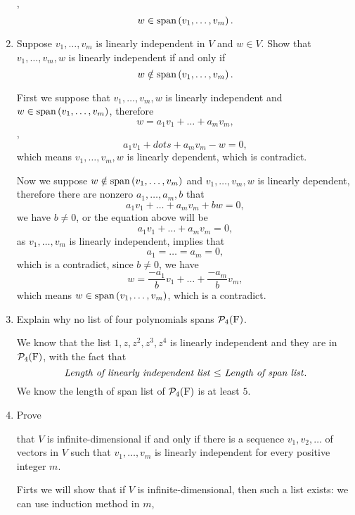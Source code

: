 \begin{enumerate}
\begin{solution}
            \ie, 
            \[ w \in \text{span}\left(v_1, \ldots, v_m\right).\]
        \end{solution}
    \item Suppose $v_1, \ldots, v_m$ is linearly independent in $V$ and $w \in V$. Show that $v_1, \ldots, v_m, w$ is linearly independent if and only if 
        \[ w \notin \text{span}\left(v_1, \ldots, v_m\right).\]
        \begin{solution}
            First we suppose that $v_1, \ldots, v_m, w$ is linearly independent and $w \in \text{span}\left(v_1, \ldots, v_m\right)$,
            therefore 
            \[ w = a_1 v_1 + \dots + a_m v_m ,\]
            \ie, 
            \[ a_1v_1 + dots + a_mv_m - w = 0,\]
            which means $v_1, \ldots, v_m, w$ is linearly dependent, which is contradict.

            Now we suppose $w \notin \text{span}\left(v_1, \ldots, v_m\right)$ and $v_1, \ldots, v_m, w$ is linearly dependent, therefore there are 
            nonzero $a_1, \ldots, a_m, b$ that 
            \[ a_1 v_1 + \dots + a_mv_m + bw = 0,\]
            we have $b \neq 0$, or the equation above will be 
            \[ a_1v_1 + \dots + a_mv_m = 0,\]
            as $v_1, \ldots, v_m$ is linearly independent, implies that 
            \[ a_1 = \dots = a_m = 0,\]
            which is a contradict, since $b \neq 0$, we have 
            \[ w = \dfrac{-a_1}{b}v_1 + \dots + \dfrac{-a_m}{b}v_m,\]
            which means $w \in \text{span}\left(v_1, \ldots, v_m\right)$, which is a contradict.
        \end{solution}
    \item Explain why no list of four polynomials spans $\mathcal{P}_4(\mathrm{F})$.
        \begin{solution}
            We know that the list $1, z, z^2, z^3, z^4$ is linearly independent and they are in $\mathcal{P}_4(\mathrm{F})$,
            with the fact that 
            \[ \text{\textit{Length of linearly independent list} $\leq$ \textit{Length of span list}}.\]
            We know the length of span list of $\mathcal{P}_4(\mathrm{F})$ is at least $5$.
        \end{solution}
    \item \hypertarget{2A-13}{Prove} that $V$ is infinite-dimensional if and only if there is a sequence $v_1, v_2, \ldots$ of vectors in $V$ such that $v_1, \ldots, v_m$ is 
        linearly independent for every positive integer $m$.
        \begin{solution}
            Firts we will show that if $V$ is infinite-dimensional, then such a list exists: 
            we can use induction method in $m$,

\end{solution}
\end{enumerate}
